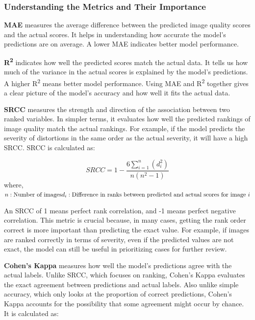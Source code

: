 \subsubsection{Understanding the Metrics and Their Importance}
\label{subsub:UnderstandingMetrics}
\textbf{MAE} measures the average difference between the predicted image quality scores and the actual scores. It helps in understanding how accurate the model’s predictions are on average. A lower MAE indicates better model performance. \par
\vspace{\baselineskip}
\noindent
\textbf{R\textsuperscript{2}} indicates how well the predicted scores match the actual data. It tells us how much of the variance in the actual scores is explained by the model’s predictions. A higher R\textsuperscript{2} means better model performance. Using MAE and R\textsuperscript{2} together gives a clear picture of the model’s accuracy and how well it fits the actual data. \par
\vspace{\baselineskip}
\noindent
\textbf{SRCC} measures the strength and direction of the association between two ranked variables. In simpler terms, it evaluates how well the predicted rankings of image quality match the actual rankings. For example, if the model predicts the severity of distortions in the same order as the actual severity, it will have a high SRCC. SRCC is calculated as: \par
\begin{equation}
    SRCC = 1 - \frac{6 \sum_{i=1}^n (d_i^2)}{n(n^2 - 1)}
\end{equation}
\noindent
where, \newline
$n: \text{Number of images} \\ d_i: \text{Difference in ranks between predicted and actual scores for image } i$ \par
\vspace{\baselineskip}
\noindent
An SRCC of 1 means perfect rank correlation, and -1 means perfect negative correlation. This metric is crucial because, in many cases, getting the rank order correct is more important than predicting the exact value. For example, if images are ranked correctly in terms of severity, even if the predicted values are not exact, the model can still be useful in prioritizing cases for further review. \par
\vspace{\baselineskip}
\noindent
\textbf{Cohen’s Kappa} measures how well the model’s predictions agree with the actual labels. Unlike SRCC, which focuses on ranking, Cohen’s Kappa evaluates the exact agreement between predictions and actual labels. Also unlike simple accuracy, which only looks at the proportion of correct predictions, Cohen’s Kappa accounts for the possibility that some agreement might occur by chance. It is calculated as: \par
